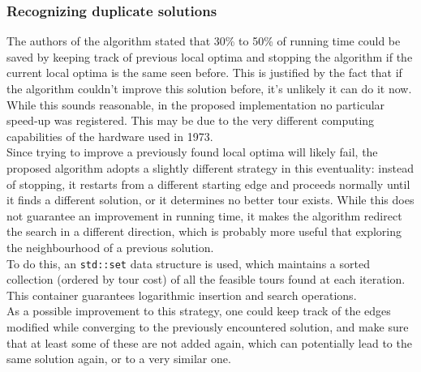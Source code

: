 \subsubsection{Recognizing duplicate solutions}
The authors of the algorithm stated that 30\% to 50\% of running time could be saved by keeping track of previous local optima and stopping the algorithm if the current local optima is the same seen before. This is justified by the fact that if the algorithm couldn't improve this solution before, it's unlikely it can do it now. While this sounds reasonable, in the proposed implementation no particular speed-up was registered. This may be due to the very different computing capabilities of the hardware used in 1973.\\
Since trying to improve a previously found local optima will likely fail, the proposed algorithm adopts a slightly different strategy in this eventuality: instead of stopping, it restarts from a different starting edge and proceeds normally until it finds a different solution, or it determines no better tour exists. While this does not guarantee an improvement in running time, it makes the algorithm redirect the search in a different direction, which is probably more useful that exploring the neighbourhood of a previous solution.\\
To do this, an \texttt{std::set} data structure is used, which maintains a sorted collection (ordered by tour cost) of all the feasible tours found at each iteration. This container guarantees logarithmic insertion and search operations.\\
As a possible improvement to this strategy, one could keep track of the edges modified while converging to the previously encountered solution, and make sure that at least some of these are not added again, which can potentially lead to the same solution again, or to a very similar one.

